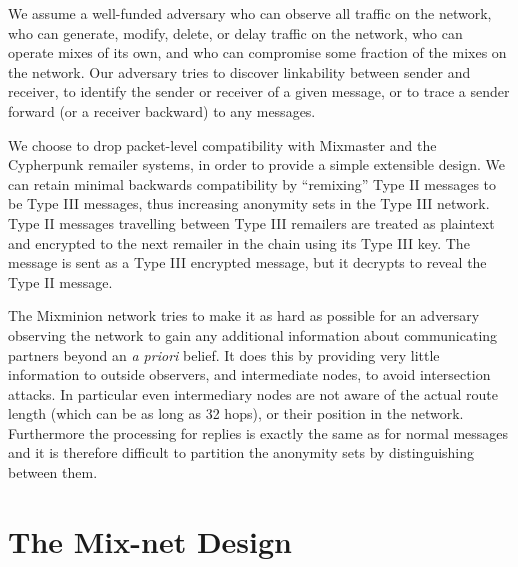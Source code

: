 \documentclass[11pt]{IEEEtran}
\begin{document}
We assume a well-funded adversary who can observe all traffic on the
network, who can generate, modify, delete, or delay traffic on the
network, who can operate mixes of its own, and who can compromise some
fraction of the mixes on the network. Our adversary tries to discover
linkability between sender and receiver, to identify the sender or
receiver of a given message, or to trace a sender forward (or a receiver
backward) to any messages.

We choose to drop packet-level compatibility with Mixmaster and the
Cypherpunk remailer systems, in order to provide a simple extensible
design. We can retain minimal backwards compatibility by ``remixing''
Type II messages to be Type III messages, thus increasing anonymity sets
in the Type III network. Type II messages travelling between Type III
remailers are treated as plaintext and encrypted to the next remailer
in the chain using its Type III key. The message is sent as a Type III
encrypted message, but it decrypts to reveal the Type II message.

The Mixminion network tries to make it as hard as possible for an
adversary observing the network to gain any additional information
about communicating partners beyond an \emph{a priori} belief. It does
this by providing very little information to outside observers, and
intermediate nodes, to avoid intersection attacks. In particular even
intermediary nodes are not aware of the actual route length (which can
be as long as 32 hops), or their position in the network. Furthermore
the processing for replies is exactly the same as for normal messages
and it is therefore difficult to partition the anonymity sets by
distinguishing between them. 






\section{The Mix-net Design}
\label{sec:design}
\end{document}
